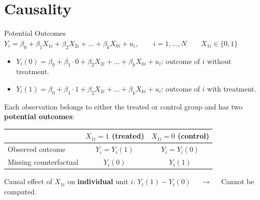 \documentclass[9pt,aspectratio=169]{beamer}
\begin{document}
\section{Causality}

\begin{frame}{Potential Outcomes}
  $
    Y_i = \beta_0 + \beta_1 X_{1i} + \beta_2 X_{2i} + \dots + \beta_k X_{ki} + u_i, 
    \qquad i=1,\dots,N
    \qquad X_{1i} \in \{0,1\}
  $
  \begin{itemize}
    \item $Y_i(0) = \beta_0 + \beta_1 \cdot 0 + \beta_2 X_{2i} + \dots + \beta_k X_{ki} + u_i$: outcome of $i$ without treatment.
    \item $Y_i(1) = \beta_0 + \beta_1 \cdot 1 + \beta_2 X_{2i} + \dots + \beta_k X_{ki} + u_i$: outcome of $i$ with treatment.
  \end{itemize}
  \pause
  \vspace{0.1cm}
  Each observation belongs to either the treated or control group and has two \textbf{potential outcomes}:
  \begin{center}
    \begin{tabular}{@{}lcc@{}}
      \toprule
      & $X_{1i}=1$ (treated) & $X_{1i}=0$ (control) \\
      \midrule
      Observed outcome  & $Y_i=Y_i(1)$ & $Y_i=Y_i(0)$ \\
      \textcolor{red!70!black}{Missing counterfactual} & \textcolor{red!70!black}{$Y_i(0)$} & \textcolor{red!70!black}{$Y_i(1)$} \\
      \bottomrule
    \end{tabular}
  \end{center}
  \vspace{0.4cm}
  Causal effect of $X_{1i}$ on \textbf{individual} unit $i$: \quad $Y_i(1) - Y_i(0)$
   $\quad \rightarrow \quad$
    Cannot be computed.
\end{frame}
\end{document}
